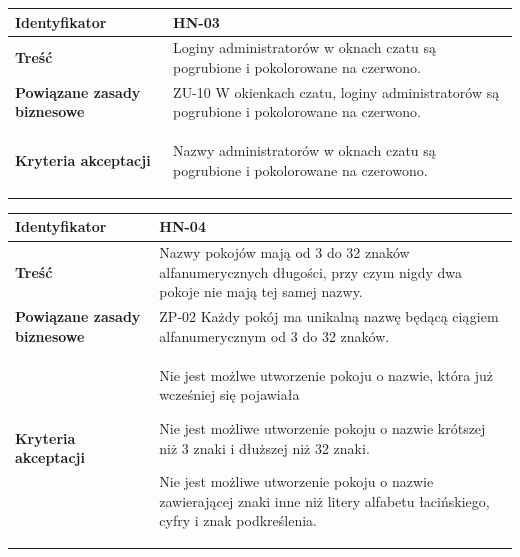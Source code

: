 \vspace{1em}

\begin{tabular}{ | l | l | }
	\hline
		\textbf{Identyfikator} &
		HN-03
		\\

	\hline
		\textbf{Treść} & \parbox[t]{11.5cm}{\strut
			Loginy administratorów w oknach czatu są pogrubione i pokolorowane na czerwono.
		\strut}\\

	\hline
		\parbox[t]{4cm}{\textbf{Powiązane zasady biznesowe}} & \parbox[t]{11.5cm}{\strut
			ZU-10 W okienkach czatu, loginy administratorów są pogrubione i pokolorowane na czerwono.
		\strut}\\

	\hline
		\parbox[t]{4cm}{\textbf{Kryteria akceptacji}} & \parbox[t]{11.5cm}{\strut
			\begin{enumreq}
				\item Nazwy administratorów w oknach czatu są pogrubione
        i pokolorowane na czerowono.
			\end{enumreq}
			\strut}
		\\

	\hline
\end{tabular}

\vspace{1em}

\begin{tabular}{ | l | l | }
	\hline
		\textbf{Identyfikator} &
		HN-04
		\\

	\hline
		\textbf{Treść} & \parbox[t]{11.5cm}{\strut
			Nazwy pokojów mają od 3 do 32 znaków alfanumerycznych długości,
      przy czym nigdy dwa pokoje nie mają tej samej nazwy.
		\strut}\\

	\hline
		\parbox[t]{4cm}{\textbf{Powiązane zasady biznesowe}} & \parbox[t]{11.5cm}{\strut
			ZP-02 Każdy pokój ma unikalną nazwę będącą ciągiem
      alfanumerycznym od 3 do 32 znaków.
		\strut}\\

	\hline
		\parbox[t]{4cm}{\textbf{Kryteria akceptacji}} & \parbox[t]{11.5cm}{\strut
			\begin{enumreq}
				\item Nie jest możlwe utworzenie pokoju o nazwie, która
        już wcześniej się pojawiała
        \item Nie jest możliwe utworzenie pokoju o nazwie krótszej niż 3 znaki i dłuższej niż 32 znaki.
        \item Nie jest możliwe utworzenie pokoju o nazwie zawierającej znaki inne niż litery alfabetu łacińskiego, cyfry i znak podkreślenia.
			\end{enumreq}
			\strut}
		\\

	\hline
\end{tabular}

